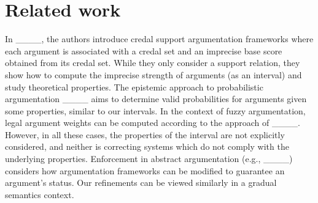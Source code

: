 \section{Related work}
\label{sec:related_worl}

In ____, the authors introduce credal support argumentation frameworks where each argument is associated with a credal set and an imprecise base score obtained from its credal set. While they only consider a support relation, they show how to compute the imprecise strength of arguments (as an interval) and study  theoretical properties.
%
The epistemic approach to probabilistic argumentation ____ aims to determine valid probabilities for arguments given some properties, similar to our intervals. In the context of fuzzy argumentation, legal argument weights can be computed according to the approach of ____. However, in all these cases, the properties of the interval are not explicitly considered, and neither is correcting systems which do not comply with the underlying properties.
%
Enforcement in abstract argumentation (e.g., ____) considers how argumentation frameworks can be modified to guarantee an argument's status. Our refinements can be viewed similarly in a gradual semantics context.